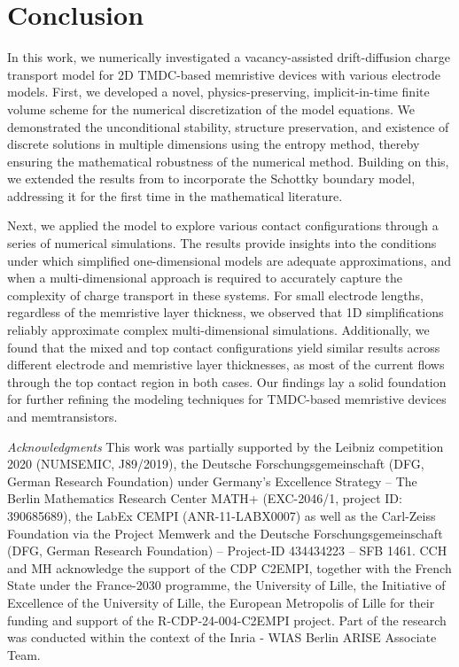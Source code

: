 \documentclass[10pt,a4paper, final]{article}
\theoremstyle{definition}								%
\numberwithin{equation}{section}
\numberwithin{figure}{section}
\numberwithin{theorem}{section}
\begin{document}
\section{Conclusion} \label{sec:conclusion}

In this work, we numerically investigated a vacancy-assisted drift-diffusion charge transport model for 2D TMDC-based memristive devices with various electrode models.
First, we developed a novel, physics-preserving, implicit-in-time finite volume scheme for the numerical discretization of the model equations.
We demonstrated the unconditional stability, structure preservation, and existence of discrete solutions in multiple dimensions using the entropy method, thereby ensuring the mathematical robustness of the numerical method.
Building on this, we extended the results from \cite{Abdel2023Existence} to incorporate the Schottky boundary model, addressing it for the first time in the mathematical literature.

Next, we applied the model to explore various contact configurations through a series of numerical simulations. The results provide insights into the conditions under which simplified one-dimensional models are adequate approximations, and when a multi-dimensional approach is required to accurately capture the complexity of charge transport in these systems.
For small electrode lengths, regardless of the memristive layer thickness, we observed that 1D simplifications reliably approximate complex multi-dimensional simulations.
Additionally, we found that the mixed and top contact configurations yield similar results across different electrode and memristive layer thicknesses, as most of the current flows through the top contact region in both cases.
Our findings lay a solid foundation for further refining the modeling techniques for TMDC-based memristive devices and memtransistors.


\vspace{1em}
\noindent
\textit{Acknowledgments}
This work was partially supported by
the Leibniz competition 2020 (NUMSEMIC, J89/2019),
the Deutsche Forschungsgemeinschaft (DFG, German Research Foundation) under Germany's Excellence Strategy -- The Berlin Mathematics Research Center MATH+ (EXC-2046/1, project ID: 390685689),
the LabEx CEMPI (ANR-11-LABX0007)
as well as
the Carl-Zeiss Foundation via the Project Memwerk
and the Deutsche Forschungsgemeinschaft (DFG, German Research Foundation) -- Project-ID 434434223 – SFB 1461.
CCH and MH acknowledge the support of the CDP C2EMPI, together with the French State under the France-2030 programme, the University of Lille, the Initiative of Excellence of the University of Lille, the European Metropolis of Lille for their funding and support of the R-CDP-24-004-C2EMPI project. Part of the research was conducted within the context of the Inria - WIAS Berlin ARISE Associate Team.
\end{document}
